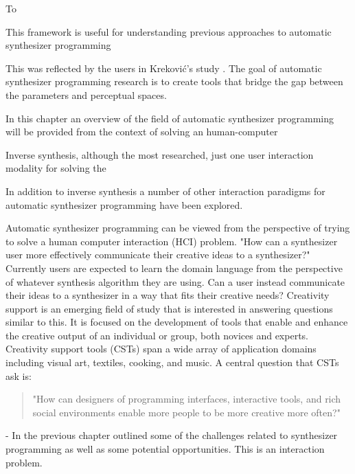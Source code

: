 To 

This framework is useful for understanding previous approaches to automatic synthesizer programming 




This was reflected by the users in Krekovi\'{c}'s study \cite{krekovic2019insights}. The goal of automatic synthesizer programming research is to create tools that bridge the gap between the parameters and perceptual spaces.

In this chapter an overview of the field of automatic synthesizer programming will be provided from the context of solving an human-computer


Inverse synthesis, although the most researched, just one user interaction modality for solving the 

In addition to inverse synthesis a number of other interaction paradigms for automatic synthesizer programming have been explored. 


Automatic synthesizer programming can be viewed from the perspective of trying to solve a human computer interaction (HCI) problem. "How can a synthesizer user more effectively communicate their creative ideas to a synthesizer?" Currently users are expected to learn the domain language from the perspective of whatever synthesis algorithm they are using. Can a user instead communicate their ideas to a synthesizer in a way that fits their creative needs? Creativity support is an emerging field of study that is interested in answering questions similar to this. It is focused on the development of tools that enable and enhance the creative output of an individual or group, both novices and experts. Creativity support tools (CSTs) \cite{shneiderman2007creativity} span a wide array of application domains including visual art, textiles, cooking, and music. A central question that CSTs ask is: 
\begin{quote}
    "How can designers of programming interfaces, interactive tools, and rich social environments enable more people to be more creative more often?"
\end{quote}

- In the previous chapter outlined some of the challenges related to synthesizer programming as well as some potential opportunities. This is an interaction problem.

